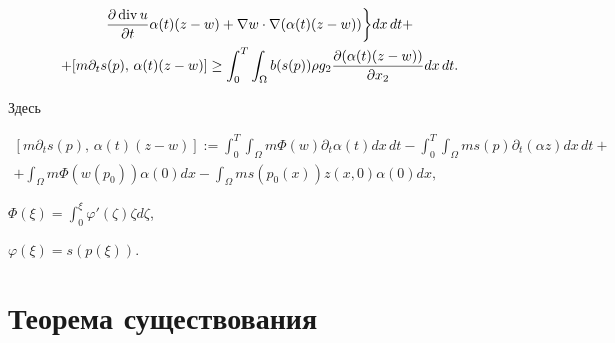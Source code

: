 \begin{defn}
\begin{multline}
\frac{\partial \Div u}{\partial t} \alpha(t) (z-w)


+ \nabla w \cdot \nabla (\alpha(t)(z-w))


\bigg \} dx\,dt + \\




+[m \partial_{t} s(p),\, \alpha(t)(z-w)] \geq


\int^{T}_{0} \int_{\Omega} b(s(p)) \rho 


g_{2} \frac{\partial (\alpha(t)(z-w))}{\partial x_{2}} dx\,dt.


\label{eq14}


\end{multline}


Здесь


\begin{multline*}


[m \partial_{t} s(p),\, \alpha(t) (z-w)]:= \int_{0}^{T}


\int_{\Omega} m \Phi(w) \partial_{t} \alpha(t) dx\, dt - 


\int_{0}^{T} \int_{\Omega} m s(p) \partial_{t}


(\alpha z) dx\, dt + \\


%


+ \int_{\Omega} m \Phi(w(p_{0})) \alpha(0) dx


 - \int_{\Omega} m s(p_{0}(x)) z(x,0) \alpha(0) dx,


\end{multline*}


$\displaystyle \Phi(\xi)=\int_{0}^{\xi} \varphi'(\zeta) \zeta d \zeta$,


$\varphi(\xi)=s(p(\xi))$.


\end{defn}





\section{Теорема существования}





